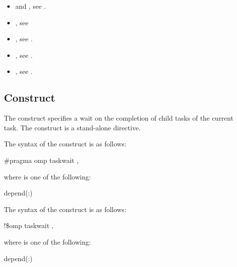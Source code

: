 \crossreferences
\begin{itemize}

\item {} and , see
  .

\item {}, see

\item {}, see
  .

\item {}, see
  .

\item {}, see
  .

\end{itemize}









\subsection{ Construct}
\label{subsec:taskwait Construct}
\summary
The  construct specifies a wait on the completion of child tasks
of the current task. The  construct is a stand-alone directive.

\syntax
\begin{ccppspecific}
The syntax of the  construct is as follows:

\begin{boxedcode}
\#pragma omp taskwait \plc{[clause[ [},\plc{] clause] ... ] new-line}
\end{boxedcode}

where  is one of the following:

\begin{indentedcodelist}
depend(:)
\end{indentedcodelist}
\end{ccppspecific}

\begin{fortranspecific}
The syntax of the  construct is as follows:

\begin{boxedcode}
!\$omp taskwait \plc{[clause[ [},\plc{] clause] ... ]}
\end{boxedcode}

where  is one of the following:

\begin{indentedcodelist}
depend(:)
\end{indentedcodelist}

\end{fortranspecific}

